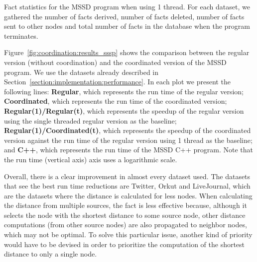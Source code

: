\begin{table}[ht]
   \begin{center}
      
   \end{center}

   \caption{Fact statistics for the MSSD program when using 1 thread. For each
      dataset, we gathered the number of facts derived, number of facts deleted,
      number of facts sent to other nodes and total number of facts in the
      database when the program terminates.}

   \label{table:coordination:sssp_stats}
\end{table}

Figure~\ref{fig:coordination:results_sssp} shows the comparison between the
regular version (without coordination) and the coordinated version of the MSSD
program. We use the datasets already described in
Section~\ref{section:implementation:performance}.  In each plot we present the
following lines: \textbf{Regular}, which represents the run time of the regular
version; \textbf{Coordinated}, which represents the run time of the coordinated
version; \textbf{Regular(1)/Regular(t)}, which represents the speedup of the
regular version using the single threaded regular version as the baseline;
\textbf{Regular(1)/Coordinated(t)}, which represents the speedup of the
coordinated version against the run time of the regular version using 1 thread
as the baseline; and \textbf{C++}, which represents the run time of the MSSD C++
program. Note that the run time (vertical axis) axis uses a logarithmic scale.

Overall, there is a clear improvement in almost every dataset used. The datasets
that see the best run time reductions are Twitter, Orkut and LiveJournal, which
are the datasets where the distance is calculated for less nodes. When
calculating the distance from multiple sources, the  fact is
less effective because, although it selects the node with the shortest distance
to some source node, other distance computations (from other source nodes) are
also propagated to neighbor nodes, which may not be optimal. To solve this
particular issue, another kind of priority would have to be devised in order to
prioritize the computation of the shortest distance to only a single node.

